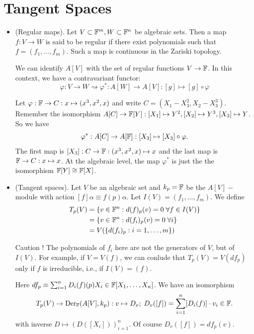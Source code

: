 \section{Tangent Spaces}
\begin{itemize}
    \item(Regular maps).
    Let $V\subset\mathbb{F}^m, W\subset\mathbb{F}^n$ be algebraic sets. 
    Then a map $f:V\to W$ is said to be regular if there exist polynomials such that 
    $f=(f_1,\dots,f_m)$. Such a map is continuous in the Zariski topology. 
    \begin{remark}
        We can identify $A[V]$ with the set of regular functions $V\to\mathbb{F}$. In this 
        context, we have a contravariant functor:
        \begin{equation}
            \varphi: V\to W \rightsquigarrow \varphi^*:A[W]\to A[V]: [g]\mapsto [g]\circ\varphi
        \end{equation}
    \end{remark}
  \begin{example}
    Let $\varphi:\mathbb{F}\to C:x\mapsto (x^3,x^2,x)$ and write $C=(X_1-X_3^2,X_2-X_3^3)$. Remember the isomorphism
    $A[C]\to \mathbb{F}[Y]: [X_1]\mapsto Y^2,[X_2]\mapsto Y^3,[X_3]\mapsto Y$. So we have 
    \begin{equation}
        \varphi^*:A[C]\to A[\mathbb{F}]:[X_3]\mapsto [X_3]\circ\varphi. 
    \end{equation}
    The first map is $[X_3]:C\to \mathbb{F}:(x^3,x^2,x)\mapsto x$ and the last map is $\mathbb{F}\to C:x\mapsto x$. 
    At the algebraic level, the map $\varphi^*$ is just the the isomorphism $\mathbb{F}[Y]\cong\mathbb{F}[X]$.
  \end{example}
  \item(Tangent spaces). Let $V$ be an algebraic set and 
  $k_p = \mathbb{F}$ be the $A[V]-$module with action $[f]\alpha\equiv f(p)\alpha$. Let 
  $I(V) = (f_1,\dots, f_m)$. We define 
  \begin{equation}
    \begin{split}
        T_p(V) &= \{v\in\mathbb{F}^n: d(f)_p(v)=0\;\forall f\in I(V)\}\\
           &=\{v\in\mathbb{F}^n: d(f_i)_p(v)=0\;\forall i\}\\
           &=V(\{d(f_i)_p:i=1,\dots,m\})
    \end{split}
  \end{equation}

  \begin{remark}
    Caution ! The polynomials of $f_i$ here are not the generators of $V$, but of $I(V)$. For example, if 
    $V=V(f)$, we can conlude that $T_p(V) = V(df_p)$ only if $f$ is irreducible, i.e., if $I(V)=(f)$.
  \end{remark}
  Here $df_p\equiv \sum_{i=1}^nD_i(f)(p)X_i\in\mathbb{F}[X_1,\dots,X_n]$. We have an isomorphism
  \begin{equation}
    T_p(V)\rightarrow \text{Der}_{\mathbb{F}}(A[V],k_p):v\mapsto D_v;\;D_v([f])=\sum_{i=1}^n[D_i(f)]\cdot v_i\in\mathbb{F}.
  \end{equation}
  with inverse $D\mapsto (D([X_i]))_{i=1}^n$. Of course $D_v([f])=df_p(v)$.
 

\end{itemize}
